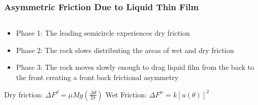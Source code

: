 \documentclass{beamer}
\begin{document}
\begin{frame}\frametitle{Asymmetric Friction Due to Liquid Thin Film}
    \begin{columns}    
        \begin{column}{0.6\textwidth}    
            \begin{itemize}
                \item Phase 1: The leading semicircle experiences dry friction
                \item Phase 2: The rock slows distributing the areas of wet and dry friction
                \item Phase 3: The rock moves slowly enough to drag liquid film from the back to the front creating a front back frictional asymmetry 
            \end{itemize}
            Dry friction: $\Delta{F}^{d} = \mu{M}g\left(\frac{\Delta\theta}{2\pi}\right)$ 
            Wet Friction: $\Delta{F}^{w} = k[u(\theta)]^{2}$

            \ 
            \


\end{column}
\end{columns}
\end{frame}
\end{document}
